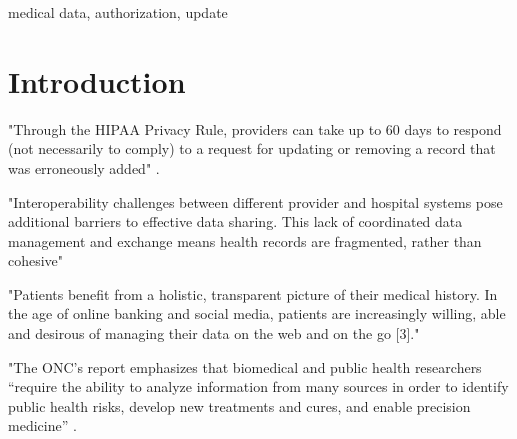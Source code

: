 \documentclass[conference]{IEEEtran}
\begin{document}
\begin{abstract}


\end{abstract}

\begin{IEEEkeywords}
medical data, authorization, update
\end{IEEEkeywords}



\section{Introduction}

"Through the HIPAA Privacy Rule, providers can take
up to 60 days to respond (not necessarily to comply) to a request for updating or removing a record that
was erroneously added" \cite{centers2004hipaa}. 

"Interoperability challenges between different provider and hospital systems pose additional
barriers to effective data sharing. This lack of coordinated data management and exchange means health records are fragmented, rather than cohesive" \cite{mandl2001public}

"Patients benefit from a holistic, transparent picture of their medical history. In the age of online banking and social media, patients are increasingly willing, able and desirous of managing their data on the web and on the go [3]."\cite{mandl2001public}

"The ONC's report emphasizes that biomedical and public health researchers “require the ability to analyze information from many sources in order to identify public health risks, develop new treatments and cures, and enable precision medicine” \cite{office2015report}.
\end{document}
